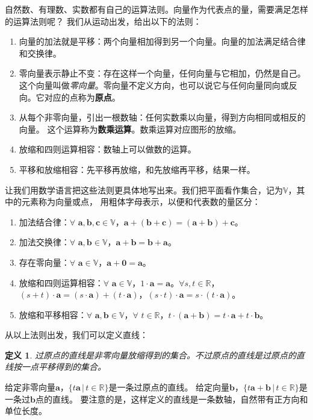\documentclass[12pt,UTF8]{ctexbook}
\newtheorem{df}{定义}[section]
\begin{document}
自然数、有理数、实数都有自己的运算法则。向量作为代表点的量，需要满足怎样的运算法则呢？
我们从运动出发，给出以下的法则：
\begin{enumerate}
    \item 向量的加法就是平移：两个向量相加得到另一个向量。向量的加法满足结合律和交换律。
    \item 零向量表示静止不变：存在这样一个向量，任何向量与它相加，仍然是自己。
    这个向量叫做\textsl{零向量}。零向量不定义方向，也可以说它与任何向量同向或反向。它对应的点称为\textbf{原点}。
    \item 从每个非零向量，引出一根数轴：任何实数乘以向量，得到方向相同或相反的向量。
    这个运算称为\textbf{数乘运算}。数乘运算对应图形的放缩。
    \item 放缩和四则运算相容：数轴上可以做数的运算。
    \item 平移和放缩相容：先平移再放缩，和先放缩再平移，结果一样。
\end{enumerate}
让我们用数学语言把这些法则更具体地写出来。我们把平面看作集合，记为$\mathbb{V}$，其中的元素称为向量或点，
用粗体字母表示，以便和代表数的量区分：
\begin{enumerate}
    \item 加法结合律：$\forall \,\, \mathbf{a}, \mathbf{b}, \mathbf{c} \in \mathbb{V}$，$\mathbf{a}+ (\mathbf{b} + \mathbf{c}) = (\mathbf{a} + \mathbf{b}) + \mathbf{c}$。
    \item 加法交换律：$\forall \,\, \mathbf{a}, \mathbf{b} \in \mathbb{V}$，$\mathbf{a} + \mathbf{b} = \mathbf{b} + \mathbf{a}$。
    \item 存在零向量：$\forall \,\, \mathbf{a} \in \mathbb{V}$，$\mathbf{a} + \mathbf{0} = \mathbf{a}$。
    \item 放缩和四则运算相容：$\forall \,\, \mathbf{a} \in \mathbb{V}$，$1\cdot \mathbf{a} = \mathbf{a}$。$\forall s, t \in \mathbb{R}$，$(s + t)\cdot\mathbf{a} = (s\cdot\mathbf{a}) + (t\cdot\mathbf{a})$，$(s \cdot t)\cdot \mathbf{a} = s \cdot (t\cdot \mathbf{a})$。
    \item 放缩和平移相容：$\forall \,\, \mathbf{a}, \mathbf{b} \in \mathbb{V}$，$\forall \,\, t \in \mathbb{R}$，$t\cdot(\mathbf{a} + \mathbf{b}) = t\cdot\mathbf{a} + t\cdot\mathbf{b}$。
\end{enumerate}
从以上法则出发，我们可以定义直线：

\begin{df}
    过原点的直线是非零向量放缩得到的集合。不过原点的直线是过原点的直线按一点平移得到的集合。
\end{df}
给定非零向量$\mathbf{a}$，$ \{t\mathbf{a} \, | \, t\in\mathbb{R}\}$是一条过原点的直线。
给定向量$\mathbf{b}$，$ \{t\mathbf{a}+\mathbf{b} \, | \, t\in\mathbb{R}\}$是一条过$\mathbf{b}$点的直线。
要注意的是，这样定义的直线是一条数轴，自然带有正方向和单位长度。
\end{document}
